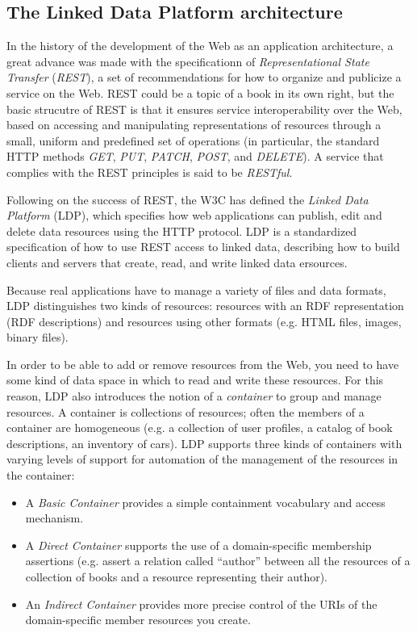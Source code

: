 \hypertarget{the-linked-data-platform-architecture}{%
\subsection{The Linked Data Platform
architecture}\label{the-linked-data-platform-architecture}}

In the history of the development of the Web as an application architecture,
a great advance was made with the specificationn of 
\emph{Representational State Transfer} (\emph{REST}), a set of recommendations 
for how to organize and publicize a service on the Web.  
REST could be a topic of a book in its own right, but the basic 
strucutre of REST is that it ensures service
interoperability over the Web, based on accessing and manipulating
representations of resources through a small, uniform and predefined set of
operations (in particular, the standard HTTP methods \emph{GET},
\emph{PUT}, \emph{PATCH}, \emph{POST}, and \emph{DELETE}). A service
that complies with the REST principles is said to be \emph{RESTful}.

Following on the success of REST, the W3C has defined the \emph{Linked Data Platform} (LDP), which
specifies how web applications can publish, edit and delete data
resources using the HTTP protocol. LDP is a standardized specification of how to use REST
access to linked data, describing how to build clients and servers that
create, read, and write linked data ersources.

Because  real applications  have to manage a variety of files and
data formats, LDP distinguishes two kinds of resources: resources with
an RDF representation (RDF descriptions) and resources using other
formats (e.g. HTML files, images, binary files).

In order to be able to add or remove resources from the Web, you need to
have some kind of data space in which to read and write these resources.
For this reason, LDP also introduces the notion of a \emph{container} to
group and manage resources.  A container is collections of resources; often the members of a container
are  homogeneous  (e.g. a collection of user profiles, a catalog of
book descriptions, an inventory of cars). LDP supports three kinds of
containers with varying levels of support for automation of the management of 
the resources in the container:

\begin{itemize}
    \item A
\emph{Basic Container} provides a simple containment vocabulary and
access mechanism. 

\item A \emph{Direct Container} supports the use of a
domain-specific membership assertions (e.g. assert a relation called
``author'' between all the resources of a collection of books and a
resource representing their author).

\item An \emph{Indirect Container} provides more precise control of the URIs of the domain-specific member
resources you create.

\end{itemize} 

